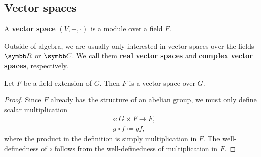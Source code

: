 \subsection{Vector spaces}\label{subsec:vector_spaces}

\begin{definition}\label{def:vector_space}
  A \textbf{vector space} \( (V, +, \cdot) \) is a module over a field \( F \).
\end{definition}

\begin{remark}\label{remark:real_vector_space}
  Outside of algebra, we are usually only interested in vector spaces over the fields \( \BB{R} \) or \( \BB{C} \). We call them \textbf{real vector spaces} and \textbf{complex vector spaces}, respectively.
\end{remark}

\begin{proposition}\label{thm:field_extension_is_vector_space}
  Let \( F \) be a field extension of \( G \). Then \( F \) is a vector space over \( G \).
\end{proposition}
\begin{proof}
  Since \( F \) already has the structure of an abelian group, we must only define scalar multiplication
  \begin{align*}
    &\circ: G \times F \to F, \\
    &g \circ f \coloneqq gf,
  \end{align*}
  where the product in the definition is simply multiplication in \( F \). The well-definedness of \( \circ \) follows from the well-definedness of multiplication in \( F \).
\end{proof}

